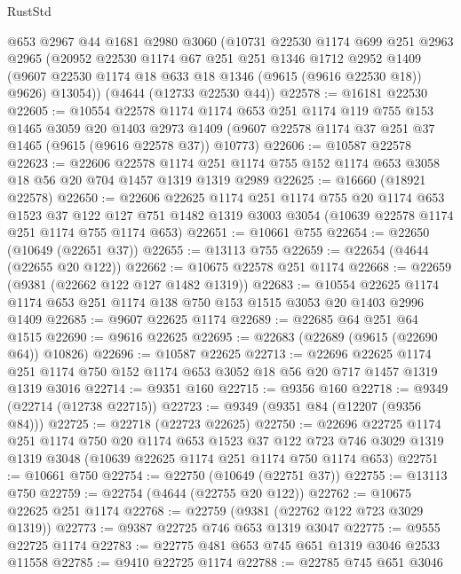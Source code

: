 \begin{lexlean}{RustStd}
\begin{coremodule}
    @653
    @2967
    @44
    @1681
    @2980
    @3060
    (@10731
      @22530
      @1174
      @699
      @251
      @2963
      @2965
      (@20952
        @22530
        @1174
        @67
        @251
        @251
        @1346
        @1712
        @2952
        @1409
        (@9607 @22530 @1174 @18 @633 @18 @1346 (@9615 (@9616 @22530 @18)) @9626)
        @13054))
    (@4644 (@12733 @22530 @44))
@22578 := @16181 @22530
@22605 := @10554
    @22578
    @1174
    @1174
    @653
    @251
    @1174
    @119
    @755
    @153
    @1465
    @3059
    @20
    @1403
    @2973
    @1409
    (@9607 @22578 @1174 @37 @251 @37 @1465 (@9615 (@9616 @22578 @37)) @10773)
@22606 := @10587 @22578
@22623 := @22606
    @22578
    @1174
    @251
    @1174
    @755
    @152
    @1174
    @653
    @3058
    @18
    @56
    @20
    @704
    @1457
    @1319
    @1319
    @2989
@22625 := @16660 (@18921 @22578)
@22650 := @22606
    @22625
    @1174
    @251
    @1174
    @755
    @20
    @1174
    @653
    @1523
    @37
    @122
    @127
    @751
    @1482
    @1319
    @3003
    @3054
    (@10639 @22578 @1174 @251 @1174 @755 @1174 @653)
@22651 := @10661 @755
@22654 := @22650 (@10649 (@22651 @37))
@22655 := @13113 @755
@22659 := @22654 (@4644 (@22655 @20 @122))
@22662 := @10675 @22578 @251 @1174
@22668 := @22659 (@9381 (@22662 @122 @127 @1482 @1319))
@22683 := @10554 @22625 @1174 @1174 @653 @251 @1174 @138 @750 @153 @1515 @3053 @20 @1403 @2996 @1409
@22685 := @9607 @22625 @1174
@22689 := @22685 @64 @251 @64 @1515
@22690 := @9616 @22625
@22695 := @22683 (@22689 (@9615 (@22690 @64)) @10826)
@22696 := @10587 @22625
@22713 := @22696
    @22625
    @1174
    @251
    @1174
    @750
    @152
    @1174
    @653
    @3052
    @18
    @56
    @20
    @717
    @1457
    @1319
    @1319
    @3016
@22714 := @9351 @160
@22715 := @9356 @160
@22718 := @9349 (@22714 (@12738 @22715))
@22723 := @9349 (@9351 @84 (@12207 (@9356 @84)))
@22725 := @22718 (@22723 @22625)
@22750 := @22696
    @22725
    @1174
    @251
    @1174
    @750
    @20
    @1174
    @653
    @1523
    @37
    @122
    @723
    @746
    @3029
    @1319
    @1319
    @3048
    (@10639 @22625 @1174 @251 @1174 @750 @1174 @653)
@22751 := @10661 @750
@22754 := @22750 (@10649 (@22751 @37))
@22755 := @13113 @750
@22759 := @22754 (@4644 (@22755 @20 @122))
@22762 := @10675 @22625 @251 @1174
@22768 := @22759 (@9381 (@22762 @122 @723 @3029 @1319))
@22773 := @9387 @22725 @746 @653 @1319 @3047
@22775 := @9555 @22725 @1174
@22783 := @22775 @481 @653 @745 @651 @1319 @3046 @2533 @11558
@22785 := @9410 @22725 @1174
@22788 := @22785 @745 @651 @3046

\end{coremodule}
\end{lexlean}
